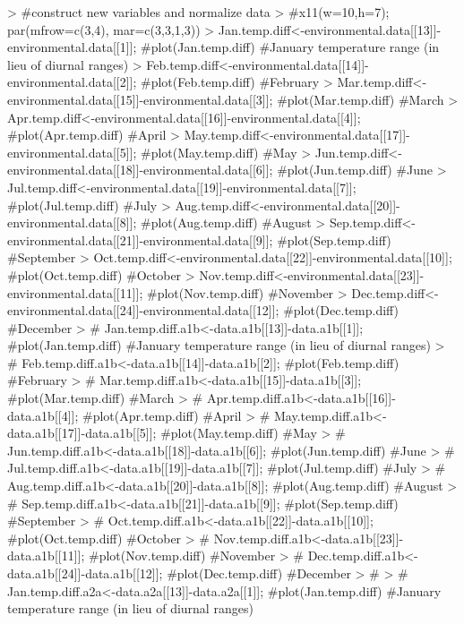 \documentclass[10pt]{article}
\renewenvironment{Schunk}{\vspace{\topsep}}{\vspace{\topsep}}
\begin{document}
\begin{Schunk}
\begin{Sinput}
> #construct new variables and normalize data
> #x11(w=10,h=7); par(mfrow=c(3,4), mar=c(3,3,1,3))
> Jan.temp.diff<-environmental.data[[13]]-environmental.data[[1]];  #plot(Jan.temp.diff)  #January temperature range (in lieu of diurnal ranges)
> Feb.temp.diff<-environmental.data[[14]]-environmental.data[[2]];  #plot(Feb.temp.diff)  #February
> Mar.temp.diff<-environmental.data[[15]]-environmental.data[[3]];  #plot(Mar.temp.diff)  #March
> Apr.temp.diff<-environmental.data[[16]]-environmental.data[[4]];  #plot(Apr.temp.diff)  #April
> May.temp.diff<-environmental.data[[17]]-environmental.data[[5]];  #plot(May.temp.diff)  #May
> Jun.temp.diff<-environmental.data[[18]]-environmental.data[[6]];  #plot(Jun.temp.diff)  #June
> Jul.temp.diff<-environmental.data[[19]]-environmental.data[[7]];  #plot(Jul.temp.diff)  #July
> Aug.temp.diff<-environmental.data[[20]]-environmental.data[[8]];  #plot(Aug.temp.diff)  #August
> Sep.temp.diff<-environmental.data[[21]]-environmental.data[[9]];  #plot(Sep.temp.diff)  #September
> Oct.temp.diff<-environmental.data[[22]]-environmental.data[[10]]; #plot(Oct.temp.diff)  #October
> Nov.temp.diff<-environmental.data[[23]]-environmental.data[[11]]; #plot(Nov.temp.diff)  #November
> Dec.temp.diff<-environmental.data[[24]]-environmental.data[[12]]; #plot(Dec.temp.diff)  #December
> # Jan.temp.diff.a1b<-data.a1b[[13]]-data.a1b[[1]];  #plot(Jan.temp.diff)  #January temperature range (in lieu of diurnal ranges)
> # Feb.temp.diff.a1b<-data.a1b[[14]]-data.a1b[[2]];  #plot(Feb.temp.diff)  #February
> # Mar.temp.diff.a1b<-data.a1b[[15]]-data.a1b[[3]];  #plot(Mar.temp.diff)  #March
> # Apr.temp.diff.a1b<-data.a1b[[16]]-data.a1b[[4]];  #plot(Apr.temp.diff)  #April
> # May.temp.diff.a1b<-data.a1b[[17]]-data.a1b[[5]];  #plot(May.temp.diff)  #May
> # Jun.temp.diff.a1b<-data.a1b[[18]]-data.a1b[[6]];  #plot(Jun.temp.diff)  #June
> # Jul.temp.diff.a1b<-data.a1b[[19]]-data.a1b[[7]];  #plot(Jul.temp.diff)  #July
> # Aug.temp.diff.a1b<-data.a1b[[20]]-data.a1b[[8]];  #plot(Aug.temp.diff)  #August
> # Sep.temp.diff.a1b<-data.a1b[[21]]-data.a1b[[9]];  #plot(Sep.temp.diff)  #September
> # Oct.temp.diff.a1b<-data.a1b[[22]]-data.a1b[[10]]; #plot(Oct.temp.diff)  #October
> # Nov.temp.diff.a1b<-data.a1b[[23]]-data.a1b[[11]]; #plot(Nov.temp.diff)  #November
> # Dec.temp.diff.a1b<-data.a1b[[24]]-data.a1b[[12]]; #plot(Dec.temp.diff)  #December
> # 
> # Jan.temp.diff.a2a<-data.a2a[[13]]-data.a2a[[1]];  #plot(Jan.temp.diff)  #January temperature range (in lieu of diurnal ranges)

\end{Sinput}
\end{Schunk}
\end{document}
